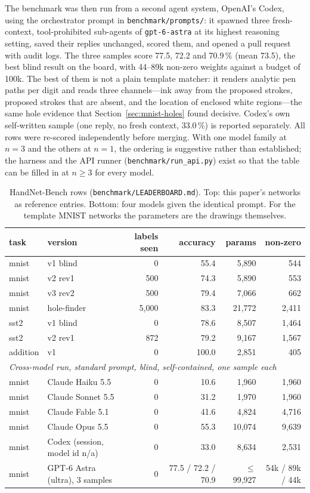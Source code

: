 The benchmark was then run from a second agent system, OpenAI's Codex, using the
orchestrator prompt in \texttt{benchmark/prompts/}: it spawned three fresh-context,
tool-prohibited sub-agents of \texttt{gpt-6-astra} at its highest reasoning setting,
saved their replies unchanged, scored them, and opened a pull request with audit
logs. The three samples score 77.5, 72.2 and 70.9\,\% (mean 73.5), the best blind
result on the board, with 44--89k non-zero weights against a budget of 100k. The
best of them is not a plain template matcher: it renders analytic pen paths per
digit and reads three channels---ink away from the proposed strokes, proposed
strokes that are absent, and the location of enclosed white regions---the same
hole evidence that Section~\ref{sec:mnist-holes} found decisive. Codex's own
self-written sample (one reply, no fresh context, 33.0\,\%) is reported separately.
All rows were re-scored independently before merging. With one model family at
$n=3$ and the others at $n=1$, the ordering is suggestive rather than established;
the harness and the API runner (\texttt{benchmark/run\_api.py}) exist so that the
table can be filled in at $n\ge3$ for every model.

\begin{table}[h]\centering\small
\begin{tabular}{llrrrr}\toprule
task & version & labels seen & accuracy & params & non-zero \\\midrule
mnist & v1 blind & 0 & 55.4 & 5{,}890 & 544 \\
mnist & v2 rev1 & 500 & 74.3 & 5{,}890 & 553 \\
mnist & v3 rev2 & 500 & 79.4 & 7{,}066 & 662 \\
mnist & hole-finder & 5{,}000 & 83.3 & 21{,}772 & 2{,}411 \\
sst2 & v1 blind & 0 & 78.6 & 8{,}507 & 1{,}464 \\
sst2 & v2 rev1 & 872 & 79.2 & 9{,}167 & 1{,}567 \\
addition & v1 & 0 & 100.0 & 2{,}851 & 405 \\\midrule
\multicolumn{6}{l}{\emph{Cross-model run, standard prompt, blind, self-contained, one sample each}}\\
mnist & Claude Haiku 5.5 & 0 & 10.6 & 1{,}960 & 1{,}960 \\
mnist & Claude Sonnet 5.5 & 0 & 31.2 & 1{,}970 & 1{,}960 \\
mnist & Claude Fable 5.1 & 0 & 41.6 & 4{,}824 & 4{,}716 \\
mnist & Claude Opus 5.5 & 0 & 55.3 & 10{,}074 & 9{,}639 \\
mnist & Codex (session, model id n/a) & 0 & 33.0 & 8{,}634 & 2{,}531 \\
mnist & GPT-6 Astra (ultra), 3 samples & 0 & 77.5 / 72.2 / 70.9 & $\le$99{,}927 & 54k / 89k / 44k \\
\bottomrule\end{tabular}
\caption{HandNet-Bench rows (\texttt{benchmark/LEADERBOARD.md}). Top: this paper's networks as reference entries. Bottom: four models given the identical prompt. For the template MNIST networks the parameters are the drawings themselves.}
\label{tab:bench}
\end{table}
